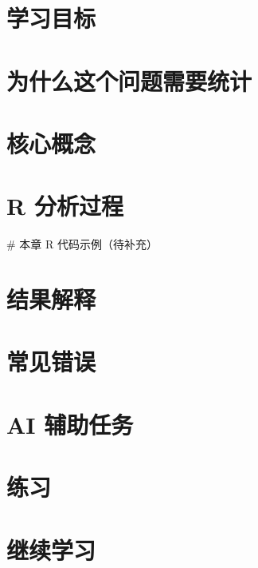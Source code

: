 \documentclass[
  letterpaper,
]{scrbook}
\newenvironment{Shaded}{\begin{snugshade}}{\end{snugshade}}
\newcommand{\CommentTok}[1]{\textcolor[rgb]{0.37,0.37,0.37}{#1}}
\begin{document}
\section{学习目标}\label{ux5b66ux4e60ux76eeux6807-8}

\section{为什么这个问题需要统计}\label{ux4e3aux4ec0ux4e48ux8fd9ux4e2aux95eeux9898ux9700ux8981ux7edfux8ba1-5}

\section{核心概念}\label{ux6838ux5fc3ux6982ux5ff5-5}

\section{R 分析过程}\label{r-ux5206ux6790ux8fc7ux7a0b-7}

\begin{Shaded}
\begin{Highlighting}[]
\CommentTok{\# 本章 R 代码示例（待补充）}
\end{Highlighting}
\end{Shaded}

\section{结果解释}\label{ux7ed3ux679cux89e3ux91ca-5}

\section{常见错误}\label{ux5e38ux89c1ux9519ux8bef-13}

\section{AI 辅助任务}\label{ai-ux8f85ux52a9ux4efbux52a1-6}

\section{练习}\label{ux7ec3ux4e60-15}

\section{继续学习}\label{ux7ee7ux7eedux5b66ux4e60-6}
\end{document}
